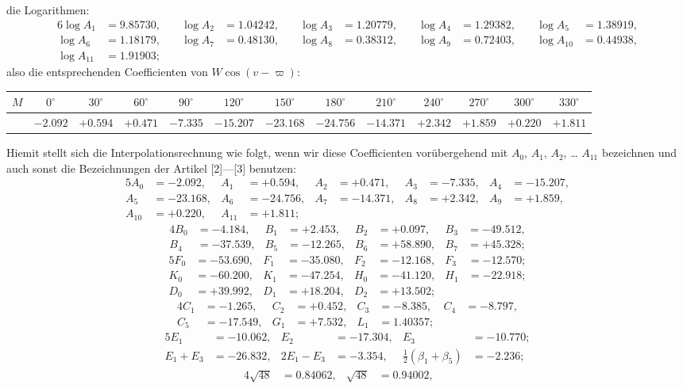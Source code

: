 \documentclass[12pt,a4paper]{article}
\begin{document}
die Logarithmen:
\begin{alignat*}{6}
\log A_1 &= 9.85730, &\quad \log A_2 &= 1.04242, &\quad \log A_3 &= 1.20779, &\quad \log A_4 &= 1.29382, &\quad \log A_5 &= 1.38919,\\
\log A_6 &= 1.18179, &\quad \log A_7 &= 0.48130, &\quad \log A_8 &= 0.38312, &\quad \log A_9 &= 0.72403, &\quad \log A_{10} &= 0.44938,\\
\log A_{11} &= 1.91903;
\end{alignat*}
also die entsprechenden Coefficienten von $W \cos(v-\varpi)$:
\begin{center}
\begin{tabular}{@{}c|cccccccccccc@{}}
$M$ & $0^{\circ}$ & $30^{\circ}$ & $60^{\circ}$ & $90^{\circ}$ & $120^{\circ}$ & $150^{\circ}$ & $180^{\circ}$ & $210^{\circ}$ & $240^{\circ}$ & $270^{\circ}$ & $300^{\circ}$ & $330^{\circ}$\\
\midrule
 & $-2.092$ & $+0.594$ & $+0.471$ & $-7.335$ & $-15.207$ & $-23.168$ & $-24.756$ & $-14.371$ & $+2.342$ & $+1.859$ & $+0.220$ & $+1.811$
\end{tabular}
\end{center}

Hiemit stellt sich die Interpolationsrechnung wie folgt, wenn wir diese Coefficienten vorübergehend mit $A_0$, $A_1$, $A_2$, \ldots{} $A_{11}$ bezeichnen und auch sonst die Bezeichnungen der Artikel [2]---[3] benutzen:
\begin{alignat*}{5}
A_0 &= -2.092, & A_1 &= +0.594, & A_2 &= +0.471, & A_3 &= -7.335, & A_4 &= -15.207,\\
A_5 &= -23.168, & A_6 &= -24.756, & A_7 &= -14.371, & A_8 &= +2.342, & A_9 &= +1.859,\\
A_{10} &= +0.220, & A_{11} &= +1.811; &&&&&
\end{alignat*}
\begin{alignat*}{4}
B_0 &= -4.184, & B_1 &= +2.453, & B_2 &= +0.097, & B_3 &= -49.512,\\
B_4 &= -37.539, & B_5 &= -12.265, & B_6 &= +58.890, & B_7 &= +45.328;
\end{alignat*}
\begin{alignat*}{5}
F_0 &= -53.690, & F_1 &= -35.080, & F_2 &= -12.168, & F_3 &= -12.570;\\
K_0 &= -60.200, & K_1 &= -47.254, & H_0 &= -41.120, & H_1 &= -22.918;\\
D_0 &= +39.992, & D_1 &= +18.204, & D_2 &= +13.502; &&
\end{alignat*}
\begin{alignat*}{4}
C_1 &= -1.265, & C_2 &= +0.452, & C_3 &= -8.385, & C_4 &= -8.797,\\
C_5 &= -17.549, & G_1 &= +7.532, & L_1 &= 1.40357; &&
\end{alignat*}
\begin{alignat*}{5}
E_1 &= -10.062, & E_2 &= -17.304, & E_3 &= -10.770;\\
E_1 + E_3 &= -26.832, & 2E_1 - E_3 &= -3.354, & \tfrac{1}{2}(\beta_1 + \beta_5) &= -2.236;
\end{alignat*}
\begin{alignat*}{4}
\sqrt{48} &= 0.84062, & \sqrt{48} &= 0.94002, &&
\end{alignat*}
\end{document}
